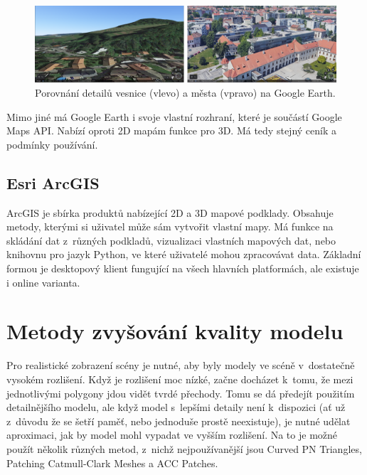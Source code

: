 \begin{figure}[H]
	\centering
	\includegraphics[width=40em]{images/google_earth_comp.png}
	\caption[caption]{Porovnání detailů vesnice (vlevo) a města (vpravo) na Google Earth.} 
	\label{google_earth_comp}
\end{figure}

Mimo jiné má Google Earth i svoje vlastní rozhraní, které je součástí Google Maps API. Nabízí oproti 2D mapám funkce pro 3D. Má tedy stejný ceník a podmínky používání.

\subsection*{Esri ArcGIS}
ArcGIS je sbírka produktů nabízející 2D a 3D mapové podklady. Obsahuje metody, kterými si uživatel může sám vytvořit vlastní mapy. Má funkce na skládání dat z~různých podkladů, vizualizaci vlastních mapových dat, nebo knihovnu pro jazyk Python, ve které uživatelé mohou zpracovávat data.
Základní formou je desktopový klient fungující na všech hlavních platformách, ale existuje i online varianta.

\section{Metody zvyšování kvality modelu} \label{tess-upscale}
Pro realistické zobrazení scény je nutné, aby byly modely ve scéně v~dostatečně vysokém rozlišení. Když je rozlišení moc nízké, začne docházet k~tomu, že mezi jednotlivými polygony jdou vidět tvrdé přechody. Tomu se dá předejít použitím detailnějšího modelu, ale když model s~lepšími detaily není k~dispozici (ať už z~důvodu že se šetří paměť, nebo jednoduše prostě neexistuje), je nutné udělat aproximaci, jak by model mohl vypadat ve vyšším rozlišení. Na to je možné použít několik různých metod, z~nichž nejpoužívanější jsou Curved PN Triangles, Patching Catmull-Clark Meshes a ACC Patches.
